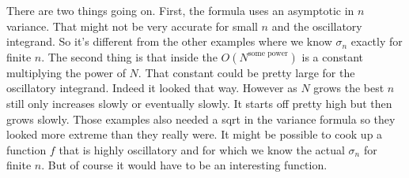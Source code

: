 \documentclass{amsart}
\newcommand{\art}[1]{{\color{blue}#1}}
\begin{document}
\begin{itemize}
\begin{itemize}
        \art{There are two things going on. First, the formula uses an asymptotic in $n$ variance.  That might not be very accurate for small $n$ and the oscillatory integrand. So it's different from the other examples where we know $\sigma_n$ exactly for finite $n$. The second thing is that inside the $O(N^\text{some power})$ is a constant multiplying the power of $N$. That constant could be pretty large for the oscillatory integrand.  Indeed it looked that  way.  However as $N$ grows the best $n$ still only increases slowly or eventually slowly. It starts off pretty high but then grows slowly.  Those examples also needed a sqrt in the variance formula so they looked more extreme than they really were.  It might be possible to cook up a function $f$ that is highly oscillatory and for which we know the actual $\sigma_n$ for finite $n$. But of course it would have to be an interesting function. }
    \end{itemize}
\end{itemize}




\end{document}

